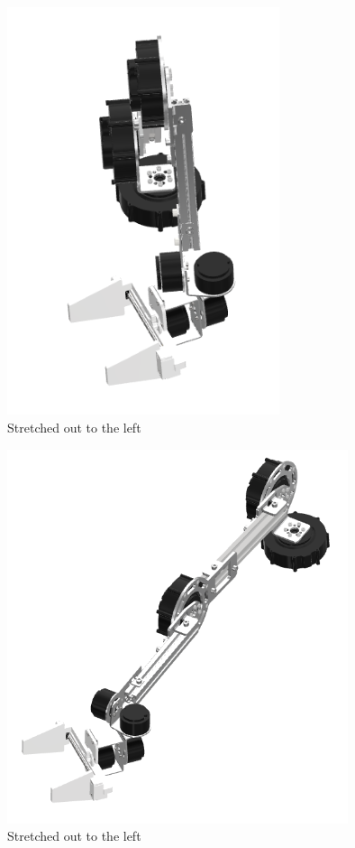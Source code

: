 \begin{figure}[h]
  \centering
  \includegraphics[width=8cm]{images/design/hidaritika.png}
  \caption{Stretched out to the left}
  \label{fig:move3}
\end{figure}

\begin{figure}[h]
  \centering
  \includegraphics[width=10cm]{images/design/hidarioku.png}
  \caption{Stretched out to the left}
  \label{fig:move4}
\end{figure}
\clearpage

